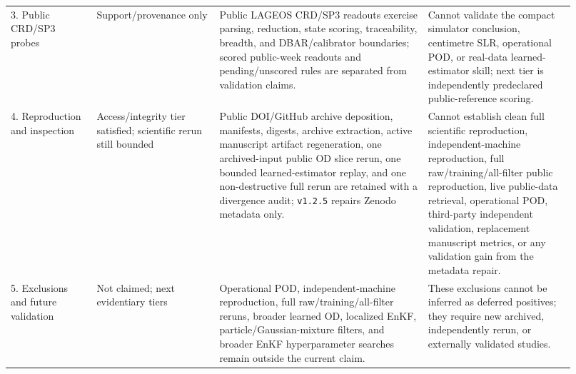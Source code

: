 \begin{table}[t]
\begin{tabular}{@{}p{0.14\linewidth}p{0.20\linewidth}p{0.34\linewidth}p{0.24\linewidth}@{}}
    3. Public CRD/SP3 probes & Support/provenance only & Public LAGEOS CRD/SP3 readouts exercise parsing, reduction, state scoring, traceability, breadth, and DBAR/calibrator boundaries; scored public-week readouts and pending/unscored rules are separated from validation claims. & Cannot validate the compact simulator conclusion, centimetre SLR, operational POD, or real-data learned-estimator skill; next tier is independently predeclared public-reference scoring. \\
    4. Reproduction and inspection & Access/integrity tier satisfied; scientific rerun still bounded & Public DOI/GitHub archive deposition, manifests, digests, archive extraction, active manuscript artifact regeneration, one archived-input public OD slice rerun, one bounded learned-estimator replay, and one non-destructive full rerun are retained with a divergence audit; \texttt{v1.2.5} repairs Zenodo metadata only. & Cannot establish clean full scientific reproduction, independent-machine reproduction, full raw/training/all-filter public reproduction, live public-data retrieval, operational POD, third-party independent validation, replacement manuscript metrics, or any validation gain from the metadata repair. \\
    5. Exclusions and future validation & Not claimed; next evidentiary tiers & Operational POD, independent-machine reproduction, full raw/training/all-filter reruns, broader learned OD, localized EnKF, particle/Gaussian-mixture filters, and broader EnKF hyperparameter searches remain outside the current claim. & These exclusions cannot be inferred as deferred positives; they require new archived, independently rerun, or externally validated studies. \\
    \bottomrule
  \end{tabular}
  \endgroup
\end{table}
